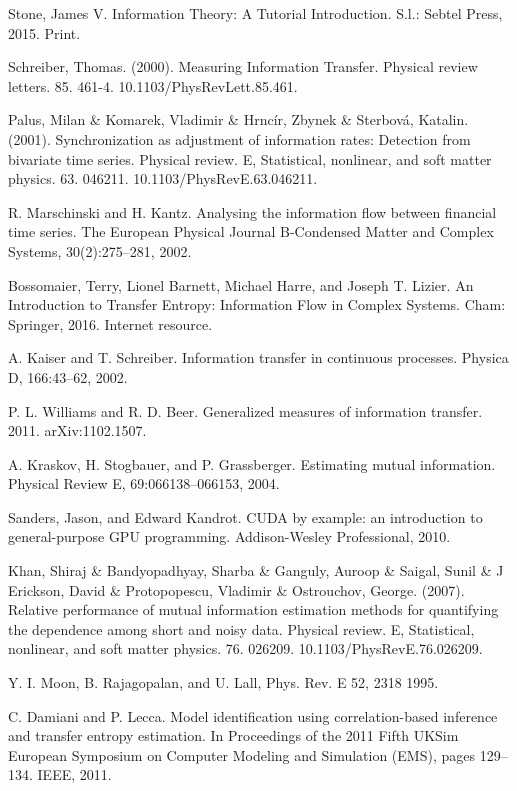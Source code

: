 \documentclass[conference]{IEEEtran}
\begin{document}
\begin{thebibliography}{00}
 Stone, James V. Information Theory: A Tutorial Introduction. S.l.: Sebtel Press, 2015. Print.

 Schreiber, Thomas. (2000). Measuring Information Transfer. Physical review letters. 85. 461-4. 10.1103/PhysRevLett.85.461.

 Palus, Milan \& Komarek, Vladimir \& Hrncír, Zbynek \& Sterbová, Katalin. (2001). Synchronization as adjustment of information rates: Detection from bivariate time series. Physical review. E, Statistical, nonlinear, and soft matter physics. 63. 046211. 10.1103/PhysRevE.63.046211.

 R. Marschinski and H. Kantz. Analysing the information flow between financial time series. The European Physical Journal B-Condensed Matter and Complex Systems, 30(2):275–281, 2002.

 Bossomaier, Terry, Lionel Barnett, Michael Harre, and Joseph T. Lizier. An Introduction to Transfer Entropy: Information Flow in Complex Systems. Cham: Springer, 2016. Internet resource.

 A. Kaiser and T. Schreiber. Information transfer in continuous processes. Physica D, 166:43–62, 2002.

 P. L. Williams and R. D. Beer. Generalized measures of information transfer. 2011. arXiv:1102.1507.

 A. Kraskov, H. Stogbauer, and P. Grassberger. Estimating mutual information. Physical Review E, 69:066138–066153, 2004.

 Sanders, Jason, and Edward Kandrot. CUDA by example: an introduction to general-purpose GPU programming. Addison-Wesley Professional, 2010.

 Khan, Shiraj \& Bandyopadhyay, Sharba \& Ganguly, Auroop \& Saigal, Sunil \& J Erickson, David \& Protopopescu, Vladimir \& Ostrouchov, George. (2007). Relative performance of mutual information estimation methods for quantifying the dependence among short and noisy data. Physical review. E, Statistical, nonlinear, and soft matter physics. 76. 026209. 10.1103/PhysRevE.76.026209.

 Y. I. Moon, B. Rajagopalan, and U. Lall, Phys. Rev. E 52, 2318 1995.

  C. Damiani and P. Lecca. Model identification using correlation-based inference and transfer entropy estimation. In Proceedings of the 2011 Fifth UKSim European Symposium on
Computer Modeling and Simulation (EMS), pages 129–134. IEEE, 2011.


\end{thebibliography}
\end{document}
